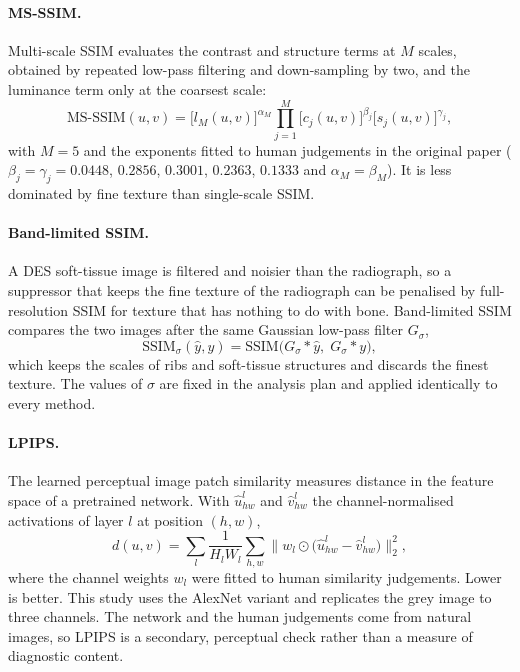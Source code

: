 \paragraph{MS-SSIM.} Multi-scale SSIM \citep{wang2003msssim} evaluates the contrast and structure terms at $M$ scales, obtained by repeated
low-pass filtering and down-sampling by two, and the luminance term only at the coarsest scale:
\begin{equation}
\mathrm{MS\text{-}SSIM}(u,v)=\big[l_M(u,v)\big]^{\alpha_M}\prod_{j=1}^{M}\big[c_j(u,v)\big]^{\beta_j}\big[s_j(u,v)\big]^{\gamma_j},
\label{eq:bg_msssim}
\end{equation}
with $M=5$ and the exponents fitted to human judgements in the original paper ($\beta_j=\gamma_j=0.0448$, $0.2856$, $0.3001$, $0.2363$, $0.1333$
and $\alpha_M=\beta_M$). It is less dominated by fine texture than single-scale SSIM.

\paragraph{Band-limited SSIM.} A DES soft-tissue image is filtered and noisier than the radiograph, so a suppressor that keeps the fine texture
of the radiograph can be penalised by full-resolution SSIM for texture that has nothing to do with bone. Band-limited SSIM compares the two images
after the same Gaussian low-pass filter $G_\sigma$,
\begin{equation}
\mathrm{SSIM}_\sigma(\hat y,y)=\mathrm{SSIM}\big(G_\sigma\ast\hat y,\;G_\sigma\ast y\big),
\label{eq:bg_blssim}
\end{equation}
which keeps the scales of ribs and soft-tissue structures and discards the finest texture. The values of $\sigma$ are fixed in the analysis plan
and applied identically to every method.

\paragraph{LPIPS.} The learned perceptual image patch similarity \citep{zhang2018lpips} measures distance in the feature space of a pretrained
network. With $\hat u^{l}_{hw}$ and $\hat v^{l}_{hw}$ the channel-normalised activations of layer $l$ at position $(h,w)$,
\begin{equation}
d(u,v)=\sum_l\frac{1}{H_lW_l}\sum_{h,w}\big\lVert w_l\odot\big(\hat u^{l}_{hw}-\hat v^{l}_{hw}\big)\big\rVert_2^2 ,
\label{eq:bg_lpips}
\end{equation}
where the channel weights $w_l$ were fitted to human similarity judgements. Lower is better. This study uses the AlexNet variant and replicates
the grey image to three channels. The network and the human judgements come from natural images, so LPIPS is a secondary, perceptual check
rather than a measure of diagnostic content.

